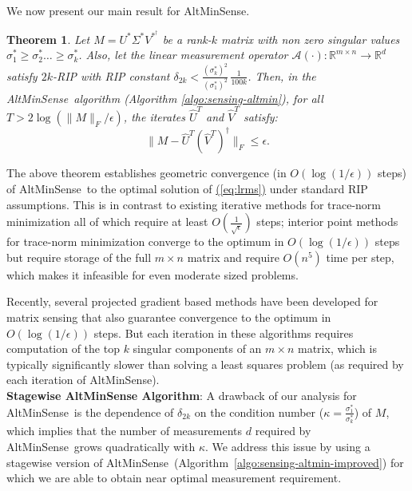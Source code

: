 \documentclass[11pt]{article}
\renewcommand{\eqref}[1]{\hyperref[#1]{(\ref*{#1})}}
\theoremstyle{plain}
\newtheorem{theorem}{Theorem}[section]
\theoremstyle{definition}
\newcommand{\rmn}{\mathbb{R}^{m \times n}}
\newcommand{\dist}{\mathrm{dist}}
\newcommand{\calA}{\mathcal{A}}
\newcommand{\so}{\sigma^*}
\newcommand{\as}{AltMinSense\ }
\newcommand{\ase}{AltMinSense}
\begin{document}
We now present our main result for \ase.
\begin{theorem}\label{thm:sensing_err}
 Let $M=U^*\Sigma^*V^{*^\dag }$ be a rank-$k$ matrix with non zero singular values $\sigma_1^*\geq \sigma_2^*\dots\geq \sigma_k^*$. Also, let the linear measurement operator $\calA(\cdot):\rmn \rightarrow \mathbb{R}^d$ satisfy $2k$-RIP with RIP constant $\delta_{2k}<\frac{(\so_k)^2}{(\so_1)^2}\,\frac{1}{100k}$.  Then, in the \as algorithm (Algorithm \ref{algo:sensing-altmin}), for all $T> 2\log (\|M\|_F/\epsilon)$,  the iterates $\widehat{U}^{T}$ and $\widehat{V}^T$ satisfy:%
 $$\|M-\widehat{U}^{T}(\widehat{V}^T)^\dag\|_F\leq \epsilon.$$
\end{theorem}
The above theorem establishes geometric convergence (in $O(\log(1/\epsilon))$ steps) of \as to the optimal solution of \eqref{eq:lrms} under standard RIP assumptions. %
This is in contrast to existing iterative methods for trace-norm minimization all of which require at least $O(\frac{1}{\sqrt{\epsilon}})$ steps; interior point methods for trace-norm minimization converge to the optimum in $O(\log(1/\epsilon))$ steps but require storage of the full $m\times n$ matrix and require $O(n^5)$ time per step, which makes it infeasible for even moderate sized problems.

Recently, several projected gradient based methods have been developed for matrix sensing \cite{JainMD10, LeeB10} that also guarantee convergence to the optimum in $O(\log (1/\epsilon))$ steps. But each iteration in these algorithms requires computation of the top $k$ singular components of an $m\times n$ matrix, which is typically significantly slower  than solving a least squares problem (as required by each iteration of \ase).\\
{\bf Stagewise AltMinSense Algorithm}: A drawback of our analysis for \as is the dependence of $\delta_{2k}$ on the condition number ($\kappa=\frac{\so_1}{\so_k}$) of $M$, which implies that the number of measurements $d$ required by \as grows quadratically with $\kappa$. We address this issue by using a stagewise version of \as (Algorithm~\ref{algo:sensing-altmin-improved}) for which we are able to obtain near optimal measurement requirement. 
\end{document}
